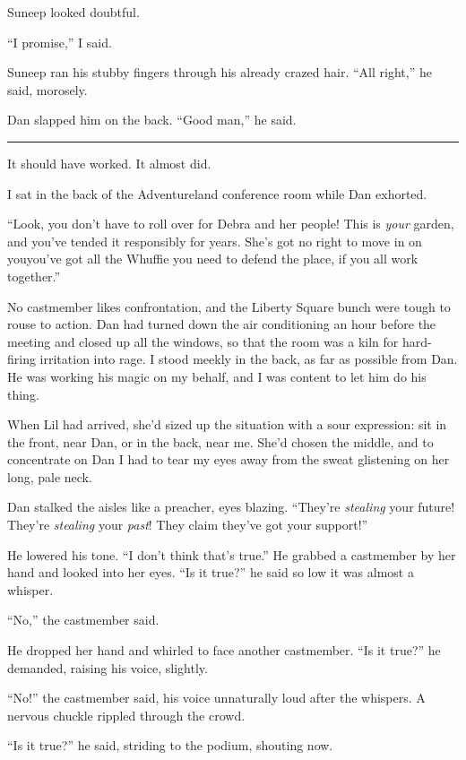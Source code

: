 Suneep looked doubtful.

“I promise,” I said.

Suneep ran his stubby fingers through his already crazed hair. “All
right,” he said, morosely.

Dan slapped him on the back. “Good man,” he said.

\begin{center}\rule{3in}{0.4pt}\end{center}

It should have worked. It almost did.

I sat in the back of the Adventureland conference room while Dan
exhorted.

“Look, you don't have to roll over for Debra and her people! This
is \emph{your} garden, and you've tended it responsibly for years.
She's got no right to move in on you{\dash}you've got all the Whuffie you
need to defend the place, if you all work together.”

No castmember likes confrontation, and the Liberty Square bunch
were tough to rouse to action. Dan had turned down the air
conditioning an hour before the meeting and closed up all the
windows, so that the room was a kiln for hard-firing irritation
into rage. I stood meekly in the back, as far as possible from Dan.
He was working his magic on my behalf, and I was content to let him
do his thing.

When Lil had arrived, she'd sized up the situation with a sour
expression: sit in the front, near Dan, or in the back, near me.
She'd chosen the middle, and to concentrate on Dan I had to tear my
eyes away from the sweat glistening on her long, pale neck.

Dan stalked the aisles like a preacher, eyes blazing. “They're
\emph{stealing} your future! They're \emph{stealing} your
\emph{past}! They claim they've got your support!”

He lowered his tone. “I don't think that's true.” He grabbed a
castmember by her hand and looked into her eyes. “Is it true?” he
said so low it was almost a whisper.

“No,” the castmember said.

He dropped her hand and whirled to face another castmember. “Is it
true?” he demanded, raising his voice, slightly.

“No!” the castmember said, his voice unnaturally loud after the
whispers. A nervous chuckle rippled through the crowd.

“Is it true?” he said, striding to the podium, shouting now.


